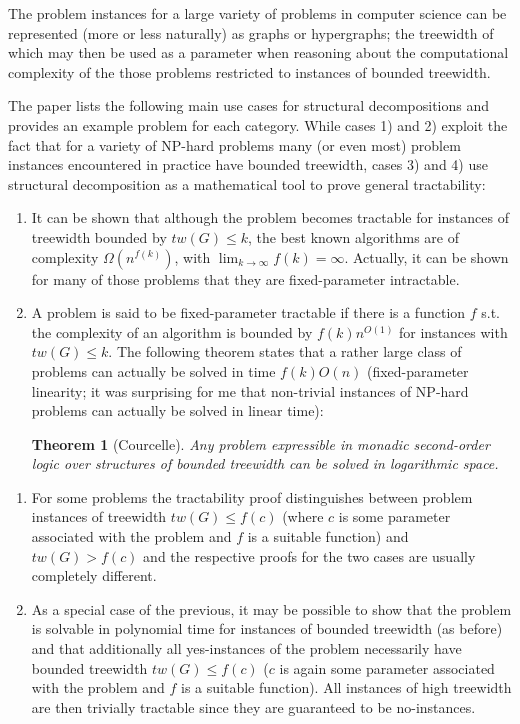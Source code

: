 \documentclass [11pt]{article}
\newtheorem{theorem}{Theorem}
\begin{document}
The problem instances for a large variety of problems in computer science can be represented (more or less naturally) as graphs or hypergraphs; the treewidth of which may then be used as a parameter when reasoning about the computational complexity of the those problems restricted to instances of bounded treewidth.

The paper lists the following main use cases for structural decompositions and provides an example problem for each category. 
While cases 1) and 2) exploit the fact that for a variety of NP-hard problems many (or even most) problem instances encountered in practice have bounded treewidth, cases 3) and 4) use structural decomposition as a mathematical tool to prove general tractability:
\begin{enumerate}[ 1) \upshape]
 \item It can be shown that although the problem becomes tractable for instances of treewidth bounded by $tw(G) \leq k$, the best known algorithms are of complexity $\Omega(n^{f(k)})$, with $\lim_{k\rightarrow \infty} f(k) = \infty$. Actually, it can be shown for many of those problems that they are fixed-parameter intractable.
 \item A problem is said to be fixed-parameter tractable if there is a function $f$ s.t. the complexity of an algorithm is bounded by $f(k) n^{O(1)}$ for instances with $tw(G) \leq k$. 
 The following theorem states that a rather large class of problems can actually be solved in time $f(k) O(n)$ (fixed-parameter linearity; it was surprising for me that non-trivial instances of NP-hard problems can actually be solved in linear time): 
 \begin{theorem}[Courcelle]
  Any problem expressible in monadic second-order logic over structures of bounded treewidth can be solved in logarithmic space.
 \end{theorem}
 \setcounter{enumTemp}{\theenumi}
\end{enumerate}
\begin{enumerate} [ 1) \upshape]
    \setcounter{enumi}{\theenumTemp}
    \item For some problems the tractability proof distinguishes between problem instances of treewidth $tw(G) \leq f(c)$ (where $c$ is some parameter associated with the problem and $f$ is a suitable function) and $tw(G) > f(c)$ and the respective proofs for the two cases are usually completely different.
    \item As a special case of the previous, it may be possible to show that the problem is solvable in polynomial time for instances of bounded treewidth (as before) and that additionally all yes-instances of the problem necessarily have bounded treewidth $tw(G) \leq f(c)$ ($c$ is again some parameter associated with the problem and $f$ is a suitable function).
    All instances of high treewidth are then trivially tractable since they are guaranteed to be no-instances.
\end{enumerate}
\end{document}
